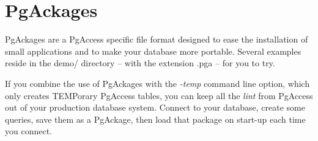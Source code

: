 \section{PgAckages}
PgAckages are a PgAccess specific file format designed to ease the installation 
of small applications and to make your database more portable. Several examples 
reside in the demo/ directory -- with the extension .pga -- for you to try.

If you combine the use of PgAckages with the \emph{-temp} command line option, 
which only creates TEMPorary PgAccess tables, you can keep all the 
\emph{lint} from PgAccess out of your production database system.
Connect to your database, create some queries, save them as a PgAckage, 
then load that package on start-up each time you connect.
